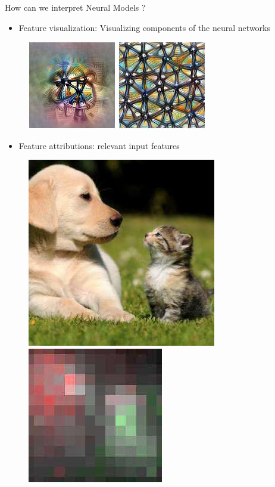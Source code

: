 \documentclass[aspectratio=169]{../latex_main/tntbeamer}
\begin{document}
\begin{frame}[c]{How can we interpret Neural Models ?}
	\begin{itemize}
		\item Feature visualization: Visualizing components of the neural networks
	\end{itemize}
	
	
\begin{figure}[h]
	\centering
	\includegraphics[scale=.5]{img134}
	\includegraphics[scale=.5]{img138}
\end{figure}


	\begin{itemize}
		\item Feature attributions: relevant input features
	\end{itemize}
	
\begin{figure}[h]
	\centering
	\includegraphics[scale=.5]{img145}
	\includegraphics[scale=.5]{img149}
\end{figure}
\end{frame}
\end{document}
